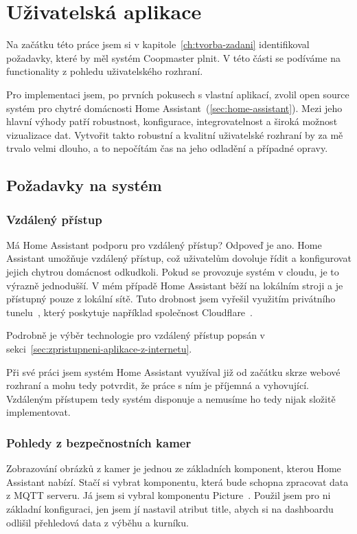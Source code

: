 \section{Uživatelská aplikace}\label{sec:tvorba-gui-rozhrani}
Na začátku této práce jsem si v kapitole~\ref{ch:tvorba-zadani} identifikoval požadavky, které by měl systém Coopmaster plnit.
V této části se podíváme na functionality z pohledu uživatelského rozhraní.

Pro implementaci jsem, po prvních pokusech s vlastní aplikací, zvolil open source systém pro chytré domácnosti Home Assistant~(\ref{sec:home-assistant}).
Mezi jeho hlavní výhody patří robustnost, konfigurace, integrovatelnost a široká možnost vizualizace dat.
Vytvořit takto robustní a kvalitní uživatelské rozhraní by za mě trvalo velmi dlouho, a to nepočítám čas na jeho odladění a případné opravy.

\subsection{Požadavky na systém}

\subsubsection*{Vzdálený přístup}
Má Home Assistant podporu pro vzdálený přístup? Odpoveď je ano.
Home Assistant umožňuje vzdálený přístup, což uživatelům dovoluje řídit a konfigurovat jejich chytrou domácnost odkudkoli.
Pokud se provozuje systém v cloudu, je to výrazně jednodušší.
V mém případě Home Assistant běží na lokálním stroji a je přístupný pouze z lokální sítě.
Tuto drobnost jsem vyřešil využitím privátního tunelu~\cite{CloudflareTunnel}, který poskytuje například společnost Cloudflare~\cite{cloudflare}.

Podrobně je výběr technologie pro vzdálený přístup popsán v sekci~\ref{sec:zpristupneni-aplikace-z-internetu}.

Při své práci jsem systém Home Assistant využíval již od začátku skrze webové rozhraní a mohu tedy potvrdit, že práce s ním je příjemná a vyhovující.
Vzdáleným přístupem tedy systém disponuje a nemusíme ho tedy nijak složitě implementovat.

\subsubsection*{Pohledy z bezpečnostních kamer}
Zobrazování obrázků z kamer je jednou ze základních komponent, kterou Home Assistant nabízí.
Stačí si vybrat komponentu, která bude schopna zpracovat data z MQTT serveru.
Já jsem si vybral komponentu Picture~\cite{HomeAssistantPictureCard}.
Použil jsem pro ni základní konfiguraci, jen jsem jí nastavil atribut title, abych si na dashboardu odlišil přehledová data z výběhu a kurníku.

